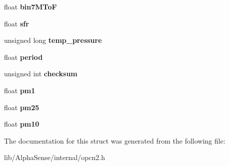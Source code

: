 \begin{DoxyCompactItemize}
float {\bfseries bin7\+M\+ToF}
\item 
\mbox{\label{structAlphaSense_1_1HistogramData_a4cc8e8d84cae4ebafadfc3027ab6bec6}} 
float {\bfseries sfr}
\item 
\mbox{\label{structAlphaSense_1_1HistogramData_a0e41ee794b59873e2cf7e39fe0502999}} 
unsigned long {\bfseries temp\+\_\+pressure}
\item 
\mbox{\label{structAlphaSense_1_1HistogramData_a629a08b8e4d410ca2b4d184b4f2f65cc}} 
float {\bfseries period}
\item 
\mbox{\label{structAlphaSense_1_1HistogramData_a354a878727843dd66d68192be3c22033}} 
unsigned int {\bfseries checksum}
\item 
\mbox{\label{structAlphaSense_1_1HistogramData_a9697f161ca3153787a926f9f7006209f}} 
float {\bfseries pm1}
\item 
\mbox{\label{structAlphaSense_1_1HistogramData_a2770aff7d07c719697ea02dafe895a0d}} 
float {\bfseries pm25}
\item 
\mbox{\label{structAlphaSense_1_1HistogramData_ad8ff09691255d9c50735514d44a41152}} 
float {\bfseries pm10}
\end{DoxyCompactItemize}


The documentation for this struct was generated from the following file\+:\begin{DoxyCompactItemize}
\item 
lib/\+Alpha\+Sense/internal/opcn2.\+h\end{DoxyCompactItemize}
